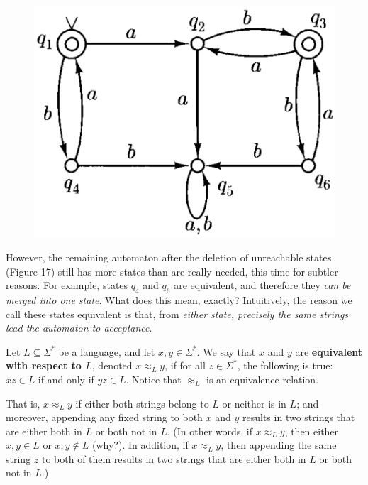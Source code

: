 \begin{figure}[h!]
  \centering
  \includegraphics[width=.3\textwidth]{img/Fig2.20.png}
  \caption{}
\end{figure}

However, the remaining automaton after the deletion of unreachable states (Figure 17) still has more states than are really needed, this time for subtler reasons. For example, states $q_4$ and $q_6$ are equivalent, and therefore they \textit{can be merged into one state}. What does this mean, exactly? Intuitively, the reason we call these states equivalent is that, from \textit{either state, precisely the same strings lead the automaton to acceptance}.

\begin{definition}{}
  Let $L \subseteq \Sigma^*$ be a language, and let $x, y \in \Sigma^*$. We say that $x$ and $y$ are \textbf{equivalent with respect to $L$}, denoted $x \approx_L y$, if for all $z \in \Sigma^*$, the following is true: $xz \in L$ if and only if $yz \in L$. Notice that $\approx_L$ is an equivalence relation. 
\end{definition}

That is, $x \approx_L y$ if either both strings belong to $L$ or neither is in $L$; and moreover, appending any fixed string to both $x$ and $y$ results in two strings that are either both in $L$ or both not in $L$. (In other words, if $x \approx_L y$, then either $x, y \in L$ or $x, y \notin L$ (why?). In addition, if $x \approx_L y$, then appending the same string $z$ to both of them results in two strings that are either both in $L$ or both not in $L$.)

